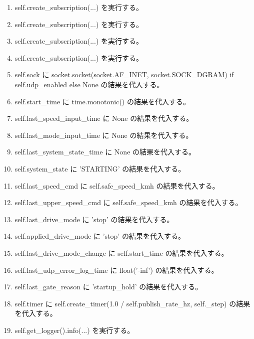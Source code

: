 \documentclass[a4paper,11pt]{article}
\begin{document}
\begin{enumerate}[leftmargin=1.8em]
\item self.create\_subscription(...) を実行する。
\item self.create\_subscription(...) を実行する。
\item self.create\_subscription(...) を実行する。
\item self.create\_subscription(...) を実行する。
\item self.sock に socket.socket(socket.AF\_INET, socket.SOCK\_DGRAM) if self.udp\_enabled else None の結果を代入する。
\item self.start\_time に time.monotonic() の結果を代入する。
\item self.last\_speed\_input\_time に None の結果を代入する。
\item self.last\_mode\_input\_time に None の結果を代入する。
\item self.last\_system\_state\_time に None の結果を代入する。
\item self.system\_state に 'STARTING' の結果を代入する。
\item self.last\_speed\_cmd に self.safe\_speed\_kmh の結果を代入する。
\item self.last\_upper\_speed\_cmd に self.safe\_speed\_kmh の結果を代入する。
\item self.last\_drive\_mode に 'stop' の結果を代入する。
\item self.applied\_drive\_mode に 'stop' の結果を代入する。
\item self.last\_drive\_mode\_change に self.start\_time の結果を代入する。
\item self.last\_udp\_error\_log\_time に float('-inf') の結果を代入する。
\item self.last\_gate\_reason に 'startup\_hold' の結果を代入する。
\item self.timer に self.create\_timer(1.0 / self.publish\_rate\_hz, self.\_step) の結果を代入する。
\item self.get\_logger().info(...) を実行する。
            \end{enumerate}
\end{document}
